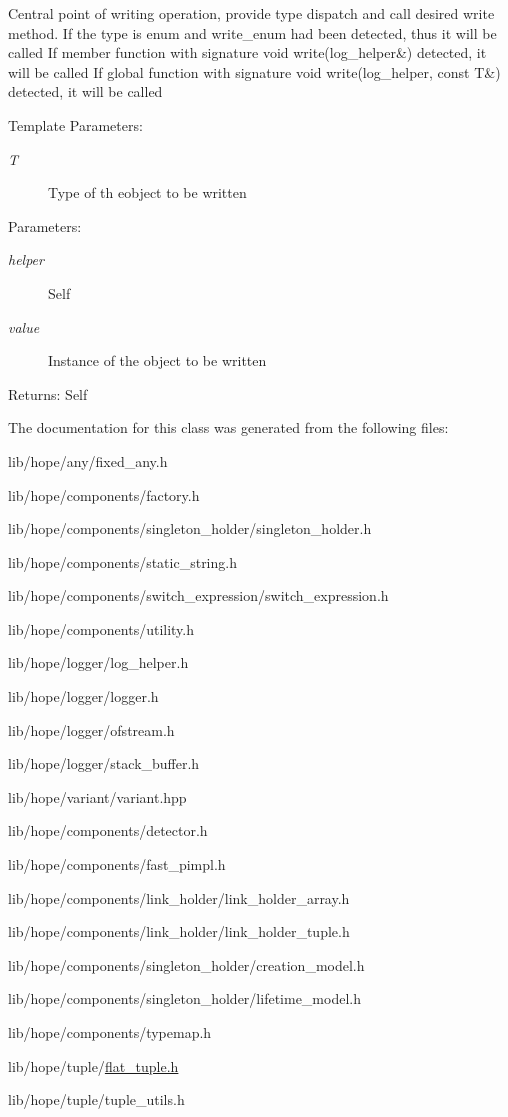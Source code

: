 Central point of writing operation, provide type dispatch and call desired write method. If the type is enum and write\_\-enum had been detected, thus it will be called If member function with signature void write(log\_\-helper\&) detected, it will be called If global function with signature void write(log\_\-helper, const T\&) detected, it will be called \begin{Desc}
\item[Template Parameters:]
\begin{description}
\item[{\em T}]Type of th eobject to be written \end{description}
\end{Desc}
\begin{Desc}
\item[Parameters:]
\begin{description}
\item[{\em helper}]Self \item[{\em value}]Instance of the object to be written \end{description}
\end{Desc}
\begin{Desc}
\item[Returns:]Self \end{Desc}


The documentation for this class was generated from the following files:\begin{CompactItemize}
\item 
lib/hope/any/fixed\_\-any.h\item 
lib/hope/components/factory.h\item 
lib/hope/components/singleton\_\-holder/singleton\_\-holder.h\item 
lib/hope/components/static\_\-string.h\item 
lib/hope/components/switch\_\-expression/switch\_\-expression.h\item 
lib/hope/components/utility.h\item 
lib/hope/logger/log\_\-helper.h\item 
lib/hope/logger/logger.h\item 
lib/hope/logger/ofstream.h\item 
lib/hope/logger/stack\_\-buffer.h\item 
lib/hope/variant/variant.hpp\item 
lib/hope/components/detector.h\item 
lib/hope/components/fast\_\-pimpl.h\item 
lib/hope/components/link\_\-holder/link\_\-holder\_\-array.h\item 
lib/hope/components/link\_\-holder/link\_\-holder\_\-tuple.h\item 
lib/hope/components/singleton\_\-holder/creation\_\-model.h\item 
lib/hope/components/singleton\_\-holder/lifetime\_\-model.h\item 
lib/hope/components/typemap.h\item 
lib/hope/tuple/\hyperlink{flat__tuple_8h}{flat\_\-tuple.h}\item 
lib/hope/tuple/tuple\_\-utils.h\end{CompactItemize}

